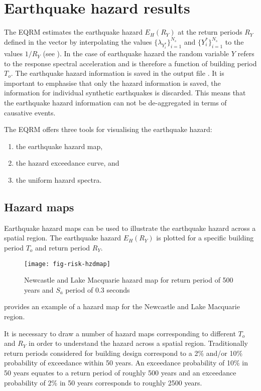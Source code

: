 \section{Earthquake hazard results}
\label{sec:risk-hzd-results} The EQRM estimates the earthquake
hazard $E_H(R_Y)$ at the return periods $R_Y$ defined in the
 vector  by
interpolating the values $\{ \lambda_{Y_i^*}\}_{i=1}^{N_s}$ and
$\{Y_i^*\}_{i=1}^{N_s}$ to the values $1/R_Y$ (see
). In the case of earthquake hazard the
random variable $Y$ refers to the response spectral
acceleration and is
therefore a function of building period $T_o$. The earthquake
hazard information is saved in the output file
. It is important to
emphasise that only the hazard information is saved, the
information for individual synthetic earthquakes is discarded.
This means that the earthquake hazard information can not be
de-aggregated in terms of causative events.

The EQRM offers three tools for visualising the earthquake hazard:
\begin{enumerate}
\item the earthquake hazard map, \item the hazard exceedance
curve, and \item the uniform hazard spectra.
\end{enumerate}

\subsection{Hazard maps}

Earthquake hazard maps can be used to illustrate the earthquake
hazard across a spatial region. The earthquake hazard $E_H(R_Y)$
is plotted for a specific building period $T_o$ and return period
$R_Y$.
\begin{figure}
\texttt{[image: fig-risk-hzdmap]}
\caption{Newcastle and Lake Macquarie hazard map for return period
of 500 years and $S_a$ period of 0.3 seconds}
\label{fig:risk-hazardmap}
\end{figure}
 provides an example of a hazard map for
the Newcastle and Lake Macquarie region.

It is necessary to draw a number of hazard maps corresponding to
different $T_o$ and $R_Y$ in order to understand the hazard across
a spatial region. Traditionally return periods considered for
building design correspond to a 2\% and/or 10\% probability of
exceedance within 50 years. An exceedance probability of 10\% in
50 years equates to a return period of roughly 500 years and an
exceedance probability of 2\% in 50 years corresponds to roughly
2500 years.

